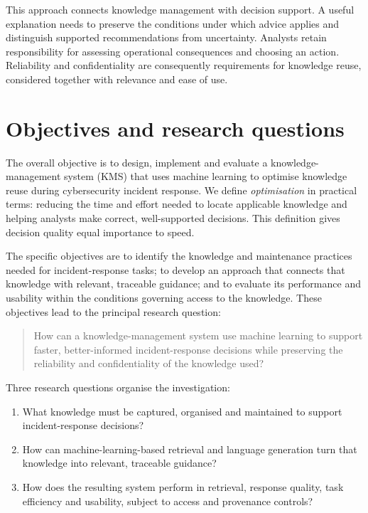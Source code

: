This approach connects knowledge management with decision support. A useful explanation needs to preserve the conditions under which advice applies and distinguish supported recommendations from uncertainty. Analysts retain responsibility for assessing operational consequences and choosing an action. Reliability and confidentiality are consequently requirements for knowledge reuse, considered together with relevance and ease of use.

\section{Objectives and research questions}
The overall objective is to design, implement and evaluate a knowledge-management system (KMS) that uses machine learning to optimise knowledge reuse during cybersecurity incident response. We define \emph{optimisation} in practical terms: reducing the time and effort needed to locate applicable knowledge and helping analysts make correct, well-supported decisions. This definition gives decision quality equal importance to speed.

The specific objectives are to identify the knowledge and maintenance practices needed for incident-response tasks; to develop an approach that connects that knowledge with relevant, traceable guidance; and to evaluate its performance and usability within the conditions governing access to the knowledge. These objectives lead to the principal research question:

\begin{quote}
How can a knowledge-management system use machine learning to support faster, better-informed incident-response decisions while preserving the reliability and confidentiality of the knowledge used?
\end{quote}

Three research questions organise the investigation:
\begin{enumerate}[label=RQ\arabic*:]
\item What knowledge must be captured, organised and maintained to support incident-response decisions?
\item How can machine-learning-based retrieval and language generation turn that knowledge into relevant, traceable guidance?
\item How does the resulting system perform in retrieval, response quality, task efficiency and usability, subject to access and provenance controls?
\end{enumerate}

